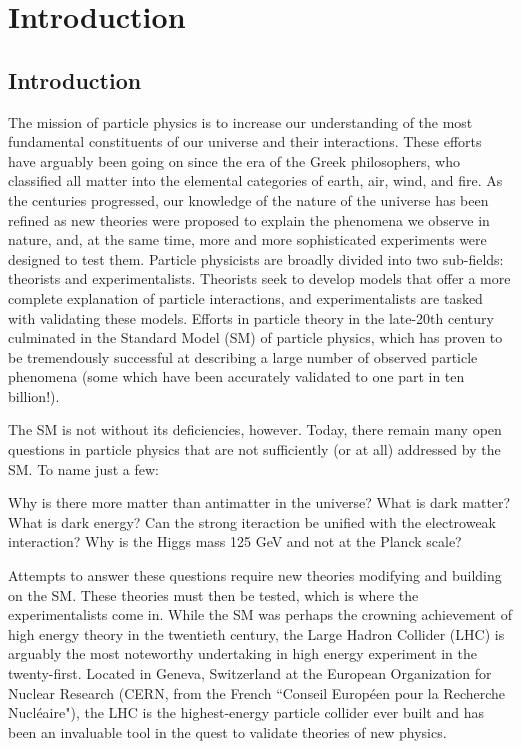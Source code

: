 \chapter{Introduction}

\section{Introduction}\label{sec:intro}

The mission of particle physics is to increase our understanding of the most fundamental constituents of our universe and their interactions. These efforts have arguably been going on since the era of the Greek philosophers, who classified all matter into the elemental categories of earth, air, wind, and fire. As the centuries progressed, our knowledge of the nature of the universe has been refined as new theories were proposed to explain the phenomena we observe in nature, and, at the same time, more and more sophisticated experiments were designed to test them. Particle physicists are broadly divided into two sub-fields: theorists and experimentalists. Theorists seek to develop models that offer a more complete explanation of particle interactions, and experimentalists are tasked with validating these models. Efforts in particle theory in the late-20th century culminated in the Standard Model (SM) of particle physics, which has proven to be tremendously successful at describing a large number of observed particle phenomena (some which have been accurately validated to one part in ten billion!).

The SM is not without its deficiencies, however. Today, there remain many open questions in particle physics that are not sufficiently (or at all) addressed by the SM. To name just a few: 

Why is there more matter than antimatter in the universe?
What is dark matter?
What is dark energy?
Can the strong iteraction be unified with the electroweak interaction?
Why is the Higgs mass 125 GeV and not at the Planck scale?

Attempts to answer these questions require new theories modifying and building on the SM. These theories must then be tested, which is where the experimentalists come in. While the SM was perhaps the crowning achievement of high energy theory in the twentieth century, the Large Hadron Collider (LHC) is arguably the most noteworthy undertaking in high energy experiment in the twenty-first. Located in Geneva, Switzerland at the European Organization for Nuclear Research (CERN, from the French ``Conseil Européen pour la Recherche Nucléaire"), the LHC is the highest-energy particle collider ever built and has been an invaluable tool in the quest to validate theories of new physics.

